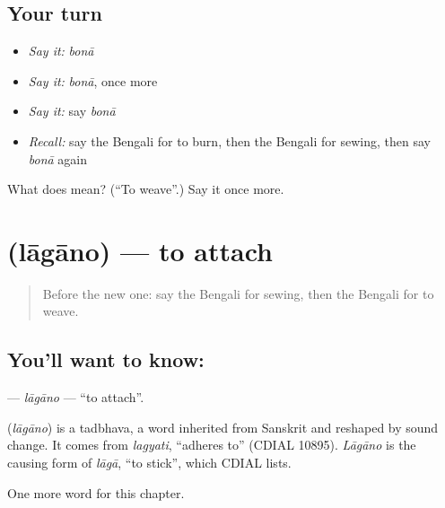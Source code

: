 \subsection*{Your turn}
\begin{itemize}
\raggedright
  \item \emph{Say it:} \emph{bonā}
  \item \emph{Say it:} \emph{bonā}, once more
  \item \emph{Say it:} say \emph{bonā}
  \item \emph{Recall:} say the Bengali for to burn, then the Bengali for sewing, then say \emph{bonā} again
\end{itemize}

\begin{tcolorbox}[breakable,colback=teal!4,colframe=teal!35!black,title={Before you move on}]
What does  mean? (\textquotedblleft{}To weave\textquotedblright{}.) Say it once more.
\end{tcolorbox}
\section[\texorpdfstring{\bn{লাগানো} (lāgāno)}{লাগানো (lāgāno)}]{ (lāgāno) — to attach}

\label{lesson:BN-C102-lagano}



\begin{quote}
Before the new one: say the Bengali for sewing, then the Bengali for to weave.
\end{quote}

\subsection*{You'll want to know: }
\textbf{} — \emph{lāgāno} — \textquotedblleft{}to attach\textquotedblright{}.

\begin{cousinweb}
\textbf{} (\emph{lāgāno}) is a tadbhava, a word inherited from Sanskrit and reshaped by sound change. It comes from \emph{lagyati}, \textquotedblleft{}adheres to\textquotedblright{} (CDIAL 10895). \emph{Lāgāno} is the causing form of \emph{lāgā}, \textquotedblleft{}to stick\textquotedblright{}, which CDIAL lists.
\end{cousinweb}

\begin{grammarlens}[title={What you've built}]
One more word for this chapter.
\end{grammarlens}

